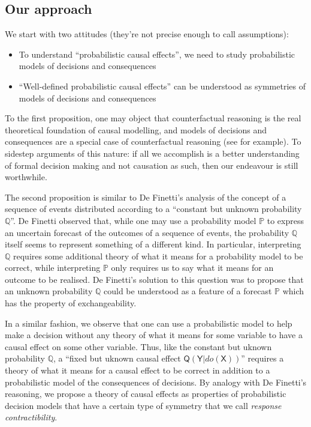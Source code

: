 \documentclass{article}
\theoremstyle{plain}
\theoremstyle{definition}
\newcommand{\RV}[1]{\ensuremath{\mathsf{#1}}}
\newcommand{\prob}[1]{\ensuremath{\mathbb{#1}}}
\begin{document}
\subsection{Our approach}

We start with two attitudes (they're not precise enough to call assumptions):
\begin{itemize}
  \item To understand ``probabilistic causal effects'', we need to study probabilistic models of decisions and consequences
  \item ``Well-defined probabilistic causal effects'' can be understood as symmetries of models of decisions and consequences
\end{itemize}

To the first proposition, one may object that counterfactual reasoning is the real theoretical foundation of causal modelling, and models of decisions and consequences are a special case of counterfactual reasoning (see \citet{pearl_book_2018} for example). To sidestep arguments of this nature: if all we accomplish is a better understanding of formal decision making and not causation as such, then our endeavour is still worthwhile. 

The second proposition is similar to De Finetti's analysis of the concept of a sequence of events distributed according to a ``constant but unknown probability $\prob{Q}$''. De Finetti observed that, while one may use a probability model $\prob{P}$ to express an uncertain forecast of the outcomes of a sequence of events, the probability $\prob{Q}$ itself seems to represent something of a different kind. In particular, interpreting $\prob{Q}$ requires some additional theory of what it means for a probability model to be correct, while interpreting $\prob{P}$ only requires us to say what it means for an outcome to be realised. De Finetti's solution to this question was to propose that an unknown probability $\prob{Q}$ could be understood as a feature of a forecast $\prob{P}$ which has the property of exchangeability.

In a similar fashion, we observe that one can use a probabilistic model to help make a decision without any theory of what it means for some variable to have a causal effect on some other variable. Thus, like the constant but uknown probability $\prob{Q}$, a ``fixed but uknown causal effect $\RV{Q}(\RV{Y}|do(\RV{X}))$'' requires a theory of what it means for a causal effect to be correct in addition to a probabilistic model of the consequences of decisions. By analogy with De Finetti's reasoning, we propose a theory of causal effects as properties of probabilistic decision models that have a certain type of symmetry that we call \emph{response contractibility}.
\end{document}
